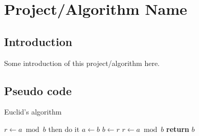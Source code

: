 \documentclass[cs4size, punct, nospace, fancyhdr, fntef]{ctexart}
\begin{document}
  \section{Project/Algorithm Name}

  \subsection{Introduction}
    Some introduction of this project/algorithm here.
  \subsection{Pseudo code}
    \begin{algorithm}
    \caption{Euclid's algorithm}\label{euclid}
    \begin{algorithmic}[1]
      \State $r\gets a\bmod b$
        \State then do it
      \EndIf
        \State $a\gets b$
        \State $b\gets r$
        \State $r\gets a\bmod b$
      \EndWhile\label{euclidendwhile}
      \State \textbf{return} $b$
    \EndProcedure
    \end{algorithmic}
    \end{algorithm}
\end{document}
